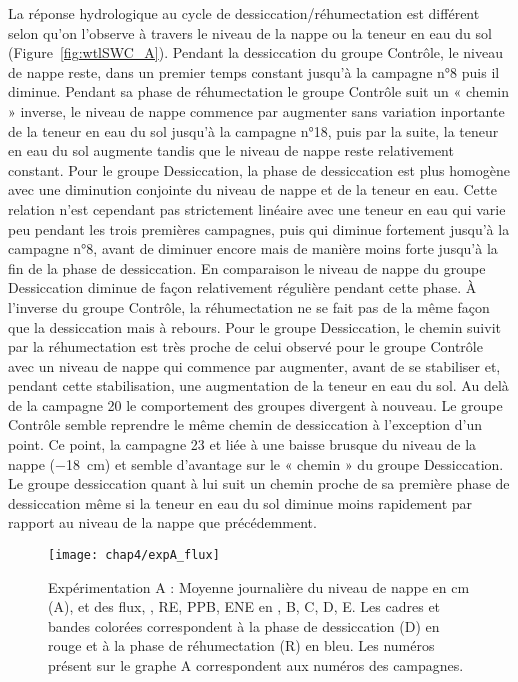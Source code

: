 La réponse hydrologique au cycle de dessiccation/réhumectation est différent selon qu'on l'observe à travers le niveau de la nappe ou la teneur en eau du sol (Figure~\ref{fig:wtlSWC_A}).
Pendant la dessiccation du groupe Contrôle, le niveau de nappe reste, dans un premier temps constant jusqu'à la campagne n°8 puis il diminue. 
Pendant sa phase de réhumectation le groupe Contrôle suit un « chemin » inverse, le niveau de nappe commence par augmenter sans variation inportante de la teneur en eau du sol jusqu'à la campagne n°18, puis par la suite, la teneur en eau du sol augmente tandis que le niveau de nappe reste relativement constant.
Pour le groupe Dessiccation, la phase de dessiccation est plus homogène avec une diminution conjointe du niveau de nappe et de la teneur en eau.
Cette relation n'est cependant pas strictement linéaire avec une teneur en eau qui varie peu pendant les trois premières campagnes, puis qui diminue fortement jusqu'à la campagne n°8, avant de diminuer encore mais de manière moins forte jusqu'à la fin de la phase de dessiccation.
En comparaison le niveau de nappe du groupe Dessiccation diminue de façon relativement régulière pendant cette phase.
À l'inverse du groupe Contrôle, la réhumectation ne se fait pas de la même façon que la dessiccation mais à rebours.
Pour le groupe Dessiccation, le chemin suivit par la  réhumectation est très proche de celui observé pour le groupe Contrôle avec un niveau de nappe qui commence par augmenter, avant de se stabiliser et, pendant cette stabilisation, une augmentation de la teneur en eau du sol.
Au delà de la campagne 20 le comportement des groupes divergent à nouveau.
Le groupe Contrôle semble reprendre le même chemin de dessiccation à l'exception d'un point.
Ce point, la campagne 23 et liée à une baisse brusque du niveau de la nappe (\SI{-18}{\centi\metre}) et semble d'avantage sur le « chemin » du groupe Dessiccation.
Le groupe dessiccation quant à lui suit un chemin proche de sa première phase de dessiccation même si la teneur en eau du sol diminue moins rapidement par rapport au niveau de la nappe que précédemment.


\begin{figure}
\centering
\texttt{[image: chap4/expA\_flux]}
\caption{Expérimentation A : Moyenne journalière du niveau de nappe en cm (A), et des flux, \chh, RE, PPB, ENE en \si{\uml}, B, C, D, E. Les cadres et bandes colorées correspondent à la phase de dessiccation (D) en rouge et à la phase de réhumectation (R) en bleu. Les numéros présent sur le graphe A correspondent aux numéros des campagnes.}
\label{fig:HMzi}
\end{figure}

